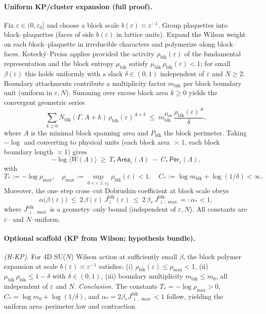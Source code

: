 \documentclass[11pt]{amsart}
\theoremstyle{plain}
\theoremstyle{definition}
\theoremstyle{remark}
\begin{document}
\paragraph{Uniform KP/cluster expansion (full proof).}
Fix $\varepsilon\in(0,\varepsilon_0]$ and choose a block scale $b(\varepsilon)\asymp \varepsilon^{-1}$. Group plaquettes into block–plaquettes (faces of side $b(\varepsilon)$ in lattice units). Expand the Wilson weight on each block–plaquette in irreducible characters and polymerize along block–faces. Koteck\'y–Preiss applies provided the activity $\rho_{\mathrm{blk}}(\varepsilon)$ of the fundamental representation and the block entropy $\mu_{\mathrm{blk}}$ satisfy $\mu_{\mathrm{blk}}\,\rho_{\mathrm{blk}}(\varepsilon) < 1$; for small $\beta(\varepsilon)$ this holds uniformly with a slack $\delta\in(0,1)$ independent of $\varepsilon$ and $N\ge2$. Boundary attachments contribute a multiplicity factor $m_{\mathrm{blk}}$ per block boundary unit (uniform in $\varepsilon,N$). Summing over excess block area $k\ge0$ yields the convergent geometric series
\[
  \sum_{k\ge 0} N_{\mathrm{blk}}(\Gamma,A+k)\,\rho_{\mathrm{blk}}(\varepsilon)^{A+k}
   \ \le\ m_{\mathrm{blk}}^{P_{\mathrm{blk}}}\,\frac{\rho_{\mathrm{blk}}(\varepsilon)^{A}}{\delta},
\]
where $A$ is the minimal block spanning area and $P_{\mathrm{blk}}$ the block perimeter. Taking $-\log$ and converting to physical units (each block area $\asymp 1$, each block boundary length $\asymp 1$) gives
\[
  -\log\langle W(\Lambda)\rangle\ \ge\ T_*\,\mathsf{Area}_\varepsilon(\Lambda)\ -\ C_*\,\mathsf{Per}_\varepsilon(\Lambda),
\]
with
\[
  T_*:= -\log \rho_{\max},\quad \rho_{\max}:=\sup_{0<\varepsilon\le\varepsilon_0}\rho_{\mathrm{blk}}(\varepsilon)<1,\quad
  C_*:= \log m_{\mathrm{blk}}+\log(1/\delta)<\infty.
\]
Moreover, the one--step cross--cut Dobrushin coefficient at block scale obeys
\[
  \alpha\bigl(\beta(\varepsilon)\bigr)\ \le\ 2\,\beta(\varepsilon)\,J^{\mathrm{blk}}_{\perp}(\varepsilon)
   \ \le\ 2\,\beta_*\,J^{\mathrm{blk}}_{\perp,\max}=:\alpha_*<1,
\]
where $J^{\mathrm{blk}}_{\perp,\max}$ is a geometry–only bound (independent of $\varepsilon,N$). All constants are $\varepsilon$– and $N$–uniform.
\paragraph{Optional scaffold (KP from Wilson; hypothesis bundle).}
\emph{(H-KP).} For 4D SU($N$) Wilson action at sufficiently small $\beta$, the block polymer expansion at scale $b(\varepsilon)\asymp \varepsilon^{-1}$ satisfies: (i) $\rho_{\mathrm{blk}}(\varepsilon)\le \rho_{\max}<1$, (ii) $\mu_{\mathrm{blk}}\,\rho_{\mathrm{blk}}\le 1-\delta$ with $\delta\in(0,1)$, (iii) boundary multiplicity $m_{\mathrm{blk}}\le m_0$, all independent of $\varepsilon$ and $N$. \emph{Conclusion.} The constants $T_*=-\log\rho_{\max}>0$, $C_* = \log m_0 + \log(1/\delta)$, and $\alpha_*=2\beta_* J^{\mathrm{blk}}_{\perp,\max}<1$ follow, yielding the uniform area–perimeter law and contraction.
\end{document}
